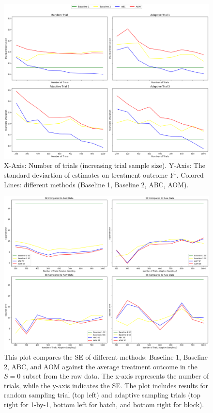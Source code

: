 \documentclass[12pt, oneside]{amsart}
\theoremstyle{definition}
\theoremstyle{remark}
\numberwithin{equation}{section}
\begin{document}
\begin{figure}[hbt!]
    \centering
    \includegraphics[scale=0.15]{Report/Figure/variance.jpg}
    \caption{X-Axis: Number of trials (increasing trial sample size). Y-Axis: The standard deviartion of estimates on treatment outcome $Y^1$. Colored Lines: different methods (Baseline 1, Baseline 2, ABC, AOM).}
    \label{variance}
\end{figure}
\FloatBarrier


\begin{figure}[hbt!]
    \centering
    \includegraphics[scale=0.15]{Report/Figure/se_raw.jpg}
    \caption{This plot compares the SE of different methods: Baseline 1, Baseline 2, ABC, and AOM against the average treatment outcome in the $S = 0$ subset from the raw data. The x-axis represents the number of trials, while the y-axis indicates the SE. The plot includes results for random sampling trial (top left) and adaptive sampling trials (top right for 1-by-1, bottom left for batch, and bottom right for block).}
    \label{se_raw}
\end{figure}
\FloatBarrier
\end{document}
